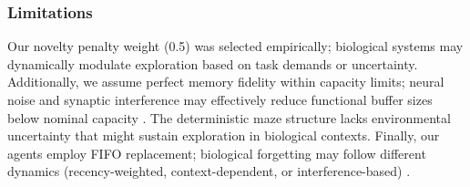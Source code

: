 \subsubsection{Limitations}

Our novelty penalty weight (0.5) was selected empirically; biological systems may dynamically modulate exploration based on task demands or uncertainty. Additionally, we assume perfect memory fidelity within capacity limits; neural noise and synaptic interference may effectively reduce functional buffer sizes below nominal capacity \cite{kitamura2018,akers2014}. The deterministic maze structure lacks environmental uncertainty that might sustain exploration in biological contexts. Finally, our agents employ FIFO replacement; biological forgetting may follow different dynamics (recency-weighted, context-dependent, or interference-based) \cite{ryan2022}.
